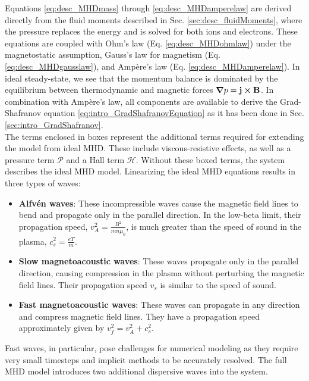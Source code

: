 Equations \ref{eq:desc_MHDmass} through \ref{eq:desc_MHDamperelaw} are derived directly from the fluid moments described in Sec. \ref{sec:desc_fluidMoments}, where the pressure replaces the energy and is solved for both ions and electrons. These equations are coupled with Ohm's law (Eq. \ref{eq:desc_MHDohmlaw}) under the magnetostatic assumption, Gauss's law for magnetism (Eq. \ref{eq:desc_MHDgausslaw}), and Ampère's law (Eq. \ref{eq:desc_MHDamperelaw}). In ideal steady-state, we see that the momentum balance is dominated by the equilibrium between thermodynamic and magnetic forces $\grad p = \mathbf{j}\cross\mathbf{B}$. In combination with Ampère's law, all components are available to derive the Grad-Shafranov equation \ref{eq:intro_GradShafranovEquation} as it has been done in Sec. \ref{sec:intro_GradShafranov}. \\
The terms enclosed in boxes represent the additional terms required for extending the model from ideal MHD. These include viscous-resistive effects, as well as a pressure term $\bm{\mathcal{P}}$ and a Hall term $\bm{\mathcal{H}}$. Without these boxed terms, the system describes the ideal MHD model. Linearizing the ideal MHD equations results in three types of waves:
\begin{itemize}
	\item \textbf{Alfvén waves}: These incompressible waves cause the magnetic field lines to bend and propagate only in the parallel direction. In the low-beta limit, their propagation speed, $v_A^2 = \frac{B^2}{mn\mu_0}$, is much greater than the speed of sound in the plasma, $c_s^2 = \frac{eT}{m}$.
	\item \textbf{Slow magnetoacoustic waves}: These waves propagate only in the parallel direction, causing compression in the plasma without perturbing the magnetic field lines. Their propagation speed $v_s$ is similar to the speed of sound.
	\item \textbf{Fast magnetoacoustic waves}: These waves can propagate in any direction and compress magnetic field lines. They have a propagation speed approximately given by $v_f^2 = v_A^2 + c_s^2$.
\end{itemize}

Fast waves, in particular, pose challenges for numerical modeling as they require very small timesteps and implicit methods to be accurately resolved. The full MHD model introduces two additional dispersive waves into the system.





